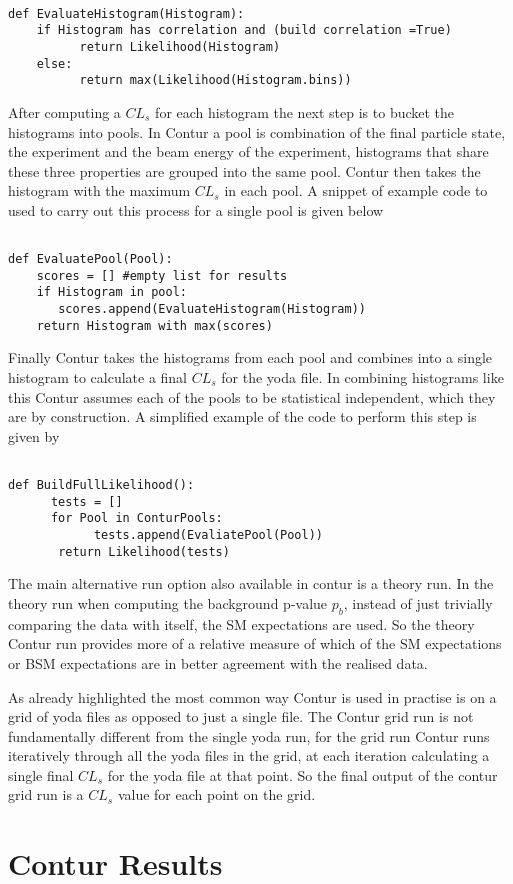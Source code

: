 \begin{verbatim}

def EvaluateHistogram(Histogram):
    if Histogram has correlation and (build correlation =True)
          return Likelihood(Histogram)
    else:
          return max(Likelihood(Histogram.bins))
\end{verbatim}
After computing a $CL_{s}$ for each histogram the next step is to bucket the histograms into pools. In Contur a pool is combination of the final particle state, the experiment and the beam energy of the experiment, histograms that share these three properties are grouped into the same pool. Contur then takes the histogram with the maximum $CL_s$ in each pool. A snippet of example code to used to carry out this process for a single pool is given below
\begin{verbatim}

def EvaluatePool(Pool):
    scores = [] #empty list for results
    if Histogram in pool:
       scores.append(EvaluateHistogram(Histogram))
    return Histogram with max(scores)
\end{verbatim}
Finally Contur takes the histograms from each pool and combines into a single histogram to calculate a final $CL_s$ for the yoda file. In combining histograms like this Contur assumes each of the pools to be statistical independent, which they are by construction. A simplified example of the code to perform this step is given by
\begin{verbatim}

def BuildFullLikelihood():
      tests = []
      for Pool in ConturPools:
            tests.append(EvaliatePool(Pool))
       return Likelihood(tests)
\end{verbatim}

The main alternative run option also available in contur is a theory run. In the theory run when computing the background p-value $p_b$, instead of just trivially comparing the data with itself, the SM expectations are used. So the theory Contur run provides more of a relative measure of which of the SM expectations or BSM expectations are in better agreement with the realised data.

As already highlighted the most common way Contur is used in practise is on a grid of yoda files as opposed to just a single file. The Contur grid run is not fundamentally different from the single yoda run, for the grid run Contur runs iteratively through all the yoda files in the grid, at each iteration calculating a single final $CL_{s}$ for the yoda file at that point. So the final output of the contur grid run is a $CL_{s}$ value for each point on the grid.


\section{Contur Results}
